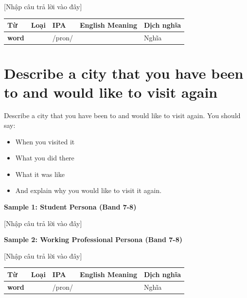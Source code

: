 [Nhập câu trả lời vào đây]

\separator


\vspace{0.8em}
\begin{center}
\renewcommand{\arraystretch}{1.65}
\begin{tabularx}{\textwidth}{|V{0.22\textwidth}|C{0.07\textwidth}|I{0.20\textwidth}|Y|V{0.18\textwidth}|}
\hline
{}
\textbf{Từ} & \textbf{Loại} & \textbf{IPA} & \textbf{English Meaning} & \textbf{Dịch nghĩa} \\
\hline
\textbf{word} & & /pron/ & & Nghĩa \\ \hline
\end{tabularx}
\end{center}

\newpage

\section{Describe a city that you have been to and would like to visit again}
\begin{ieltsprompt}
Describe a city that you have been to and would like to visit again.
You should say:
\begin{itemize}[leftmargin=2em, itemsep=2pt]
\item When you visited it
\item What you did there
\item What it was like
\item And explain why you would like to visit it again.
\end{itemize}
\end{ieltsprompt}
\begin{ieltsanswer}
\textbf{Sample 1: Student Persona (Band 7-8)}

[Nhập câu trả lời vào đây]

\textbf{Sample 2: Working Professional Persona (Band 7-8)}

[Nhập câu trả lời vào đây]
\end{ieltsanswer}


\vspace{0.8em}
\begin{center}
\renewcommand{\arraystretch}{1.65}
\begin{tabularx}{\textwidth}{|V{0.22\textwidth}|C{0.07\textwidth}|I{0.20\textwidth}|Y|V{0.18\textwidth}|}
\hline
{}
\textbf{Từ} & \textbf{Loại} & \textbf{IPA} & \textbf{English Meaning} & \textbf{Dịch nghĩa} \\
\hline
\textbf{word} & & /pron/ & & Nghĩa \\ \hline
\end{tabularx}
\end{center}

